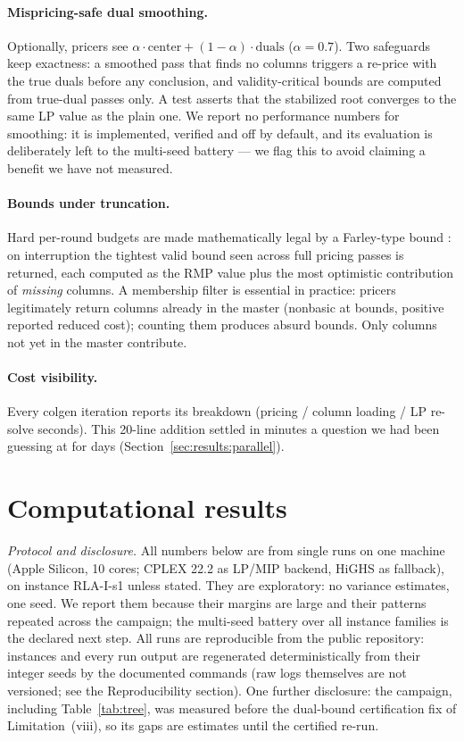\documentclass[11pt]{article}
\begin{document}
\paragraph{Mispricing-safe dual smoothing.} Optionally, pricers see
$\alpha \cdot \mathrm{center} + (1-\alpha)\cdot \mathrm{duals}$
\cite{wentges1997,dumerle1999} ($\alpha=0.7$). Two safeguards keep
exactness: a smoothed pass that finds no columns triggers a re-price with
the true duals before any conclusion, and validity-critical bounds are
computed from true-dual passes only. A test asserts that the stabilized
root converges to the same LP value as the plain one. We report no
performance numbers for smoothing: it is implemented, verified and off by
default, and its evaluation is deliberately left to the multi-seed battery
--- we flag this to avoid claiming a benefit we have not measured.

\paragraph{Bounds under truncation.} Hard per-round budgets are made
mathematically legal by a Farley-type bound \cite{farley1990}: on
interruption the tightest valid bound seen across full pricing passes is
returned, each computed as the RMP value plus the most optimistic
contribution of \emph{missing} columns. A membership filter is essential in
practice: pricers legitimately return columns already in the master
(nonbasic at bounds, positive reported reduced cost); counting them
produces absurd bounds. Only columns not yet in the master contribute.

\paragraph{Cost visibility.} Every colgen iteration reports its breakdown
(pricing / column loading / LP re-solve seconds). This 20-line addition
settled in minutes a question we had been guessing at for days
(Section~\ref{sec:results:parallel}).

\section{Computational results}\label{sec:results}

\emph{Protocol and disclosure.} All numbers below are from single runs on
one machine (Apple Silicon, 10 cores; CPLEX 22.2 as LP/MIP backend, HiGHS
as fallback), on instance RLA-I-s1 unless stated. They are exploratory:
no variance estimates, one seed. We report them because their margins are
large and their patterns repeated across the campaign; the multi-seed
battery over all instance families is the declared next step. All runs are
reproducible from the public repository: instances and every run output
are regenerated deterministically from their integer seeds by the
documented commands (raw logs themselves are not versioned; see the
Reproducibility section). One further disclosure: the campaign, including
Table~\ref{tab:tree}, was measured before the dual-bound certification
fix of Limitation~(viii), so its gaps are estimates until the certified
re-run.
\end{document}
